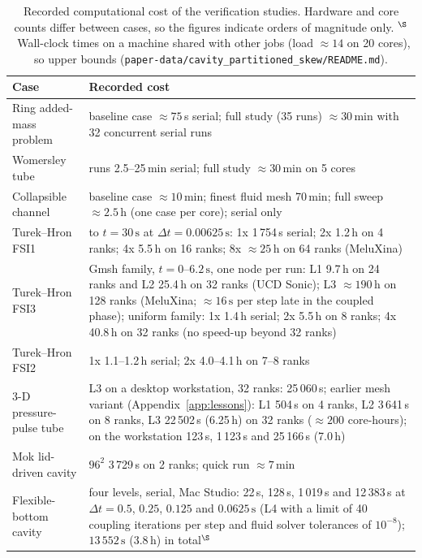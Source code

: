 \begin{table}[htbp]
	\centering
	\footnotesize
	\setlength{\tabcolsep}{3pt}
	\caption{Recorded computational cost of the verification studies. Hardware and core counts differ between cases, so the figures indicate orders of magnitude only. $^\S$~Wall-clock times on a machine shared with other jobs (load $\approx14$ on 20 cores), so upper bounds (\texttt{paper-data/cavity\_partitioned\_skew/README.md}).}
	\label{tab:cost}
	\begin{tabular}{p{3.0cm}p{10.8cm}}
		\toprule
		Case & Recorded cost \\
		\midrule
		Ring added-mass problem & baseline case $\approx75$\,s serial; full study (35 runs) $\approx30$\,min with 32 concurrent serial runs \\
		Womersley tube & runs 2.5--25\,min serial; full study $\approx30$\,min on 5 cores \\
		Collapsible channel & baseline case $\approx10$\,min; finest fluid mesh 70\,min; full sweep $\approx2.5$\,h (one case per core); serial only \\
		Turek--Hron FSI1 & to $t = 30\,\mathrm{s}$ at $\Delta t = 0.00625\,\mathrm{s}$: 1x 1\,754\,s serial; 2x 1.2\,h on 4 ranks; 4x 5.5\,h on 16 ranks; 8x $\approx25$\,h on 64 ranks (MeluXina) \\
		Turek--Hron FSI3 & Gmsh family, $t = 0$--$6.2\,\mathrm{s}$, one node per run: L1 9.7\,h on 24 ranks and L2 25.4\,h on 32 ranks (UCD Sonic); L3 $\approx190$\,h on 128 ranks (MeluXina; $\approx16\,\mathrm{s}$ per step late in the coupled phase); uniform family: 1x 1.4\,h serial; 2x 5.5\,h on 8 ranks; 4x 40.8\,h on 32 ranks (no speed-up beyond 32 ranks) \\
		Turek--Hron FSI2 & 1x 1.1--1.2\,h serial; 2x 4.0--4.1\,h on 7--8 ranks \\
		3-D pressure-pulse tube & L3 on a desktop workstation, 32 ranks: 25\,060\,s; earlier mesh variant (Appendix~\ref{app:lessons}): L1 504\,s on 4 ranks, L2 3\,641\,s on 8 ranks, L3 22\,502\,s (6.25\,h) on 32 ranks ($\approx200$ core-hours); on the workstation 123\,s, 1\,123\,s and 25\,166\,s (7.0\,h) \\
		Mok lid-driven cavity & $96^2$ 3\,729\,s on 2 ranks; quick run $\approx7$\,min \\
		Flexible-bottom cavity & four levels, serial, Mac Studio: 22\,s, 128\,s, 1\,019\,s and 12\,383\,s at $\Delta t = 0.5$, $0.25$, $0.125$ and $0.0625\,\mathrm{s}$ (L4 with a limit of 40 coupling iterations per step and fluid solver tolerances of $10^{-8}$); $13\,552\,\mathrm{s}$ ($3.8$\,h) in total$^\S$ \\

\end{tabular}
\end{table}
